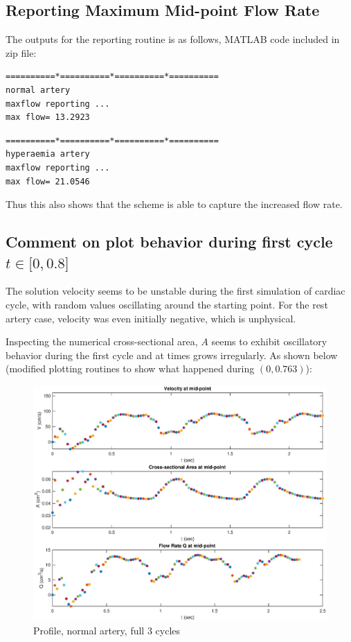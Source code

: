 \documentclass[12pt]{article} %
\begin{document}
\subsection{Reporting Maximum Mid-point Flow Rate}
The outputs for the reporting routine is as follows, MATLAB code included in zip file:
\begin{verbatim}
==========*==========*==========*==========
normal artery
maxflow reporting ...
max flow= 13.2923
\end{verbatim}

\begin{verbatim}
==========*==========*==========*==========
hyperaemia artery
maxflow reporting ...
max flow= 21.0546
\end{verbatim}

Thus this also shows that the scheme is able to capture the increased flow rate.
\subsection{Comment on plot behavior during first cycle $t\in\big[ 0,0.8\big]$}
The solution velocity seems to be unstable during the first simulation of cardiac cycle, with random values oscillating around the starting point. For the rest artery case, velocity was even initially negative, which is unphysical. 

Inspecting the numerical cross-sectional area, $A$ seems to exhibit oscillatory behavior during the first cycle and at times grows irregularly. As shown below (modified plotting routines to show what happened during $(0,0.763)$):
\begin{figure}[h!]
\caption{Profile, normal artery, full 3 cycles}
\centering
\includegraphics[width=1.0\textwidth]{full1.eps}
\end{figure}
\end{document}
